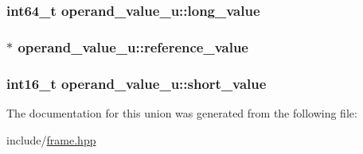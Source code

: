 \hypertarget{unionoperand__value__u_a867f9ef828309d9781b887d12f606199}{
\subsubsection[{long\+\_\+value}]{\setlength{\rightskip}{0pt plus 5cm}int64\+\_\+t operand\+\_\+value\+\_\+u\+::long\+\_\+value}}\label{unionoperand__value__u_a867f9ef828309d9781b887d12f606199}
\hypertarget{unionoperand__value__u_af760b5c7bc708eb1d4ec87a9489b57ef}{
\subsubsection[{reference\+\_\+value}]{$\ast$ operand\+\_\+value\+\_\+u\+::reference\+\_\+value}}\label{unionoperand__value__u_af760b5c7bc708eb1d4ec87a9489b57ef}
\hypertarget{unionoperand__value__u_aa25b00a9b4e1a83eb0c640c50b055bc9}{
\subsubsection[{short\+\_\+value}]{\setlength{\rightskip}{0pt plus 5cm}int16\+\_\+t operand\+\_\+value\+\_\+u\+::short\+\_\+value}}\label{unionoperand__value__u_aa25b00a9b4e1a83eb0c640c50b055bc9}


The documentation for this union was generated from the following file\+:\begin{DoxyCompactItemize}
\item 
include/\hyperlink{frame_8hpp}{frame.\+hpp}\end{DoxyCompactItemize}
